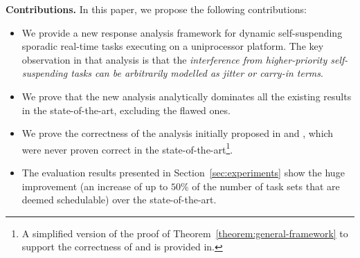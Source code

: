 \noindent\textbf{Contributions.} In this paper, we propose the following contributions:
\begin{itemize}
\item We provide a new response analysis framework for dynamic self-suspending
  sporadic real-time tasks executing on a uniprocessor platform. The key observation in that analysis is that the \emph{interference from higher-priority
    self-suspending tasks can be arbitrarily modelled as jitter or
    carry-in terms}.
\item We prove that the new analysis analytically
  dominates all the existing results in the state-of-the-art, excluding the flawed ones.  
\item We prove the
  correctness of the analysis initially proposed in \cite[p.
  164-165]{Liu:2000:RS:518501} and
  \cite[p. 267]{DBLP:conf/rtss/RajkumarSL88}, which were never proven correct in the state-of-the-art\footnote{A simplified
    version of the proof of Theorem~\ref{theorem:general-framework} to support the correctness of \cite[p. 164-165]{Liu:2000:RS:518501} and \cite[p. 267]{DBLP:conf/rtss/RajkumarSL88} is
  provided in\cite{ChenHuangNelissen}.}.
\item The evaluation results presented in Section~\ref{sec:experiments} show the huge improvement (an increase of up to $50\%$ of the number of task sets that are deemed schedulable) over the state-of-the-art.
\end{itemize}
